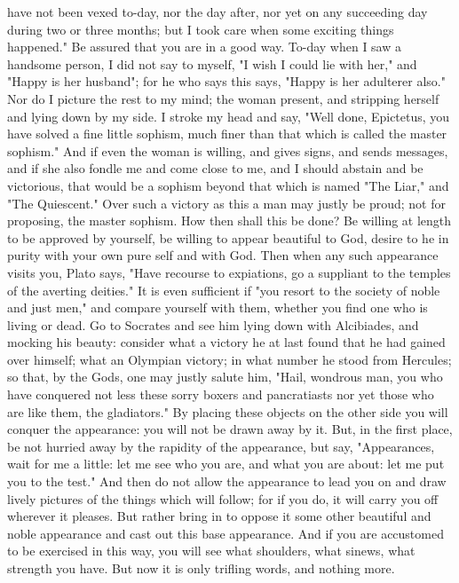 \documentclass[a4paper]{article}
\begin{document}
have not been vexed to-day, nor the day after, nor yet on any succeeding day
during two or three months; but I took care when some exciting things
happened." Be assured that you are in a good way. To-day when I saw a handsome
person, I did not say to myself, "I wish I could lie with her," and "Happy is
her husband"; for he who says this says, "Happy is her adulterer also." Nor do
I picture the rest to my mind; the woman present, and stripping herself and
lying down by my side. I stroke my head and say, "Well done, Epictetus, you
have solved a fine little sophism, much finer than that which is called the
master sophism." And if even the woman is willing, and gives signs, and sends
messages, and if she also fondle me and come close to me, and I should abstain
and be victorious, that would be a sophism beyond that which is named "The
Liar," and "The Quiescent." Over such a victory as this a man may justly be
proud; not for proposing, the master sophism.
    How then shall this be done? Be willing at length to be approved by
yourself, be willing to appear beautiful to God, desire to he in purity with
your own pure self and with God. Then when any such appearance visits you,
Plato says, "Have recourse to expiations, go a suppliant to the temples of the
averting deities." It is even sufficient if "you resort to the society of noble
and just men," and compare yourself with them, whether you find one who is
living or dead. Go to Socrates and see him lying down with Alcibiades, and
mocking his beauty: consider what a victory he at last found that he had gained
over himself; what an Olympian victory; in what number he stood from Hercules;
so that, by the Gods, one may justly salute him, "Hail, wondrous man, you who
have conquered not less these sorry boxers and pancratiasts nor yet those who
are like them, the gladiators." By placing these objects on the other side you
will conquer the appearance: you will not be drawn away by it. But, in the
first place, be not hurried away by the rapidity of the appearance, but say,
"Appearances, wait for me a little: let me see who you are, and what you are
about: let me put you to the test." And then do not allow the appearance to
lead you on and draw lively pictures of the things which will follow; for if
you do, it will carry you off wherever it pleases. But rather bring in to
oppose it some other beautiful and noble appearance and cast out this base
appearance. And if you are accustomed to be exercised in this way, you will see
what shoulders, what sinews, what strength you have. But now it is only
trifling words, and nothing more.
\end{document}
